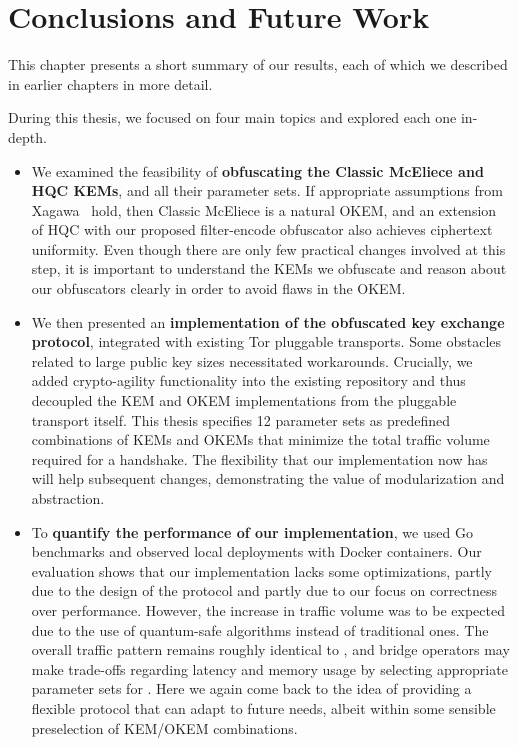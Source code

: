 \chapter{Conclusions and Future Work} \label{ch:conclusion}

This chapter presents a short summary of our results, each of which we described in earlier chapters in more detail.

During this thesis, we focused on four main topics and explored each one in-depth.
\begin{itemize}
    \item We examined the feasibility of \textbf{obfuscating the Classic McEliece and HQC KEMs}, and all their parameter sets. If appropriate assumptions from Xagawa~\cite{EC:Xagawa22} hold, then Classic McEliece is a natural OKEM, and an extension of HQC with our proposed filter-encode obfuscator also achieves ciphertext uniformity.
    Even though there are only few practical changes involved at this step, it is important to understand the KEMs we obfuscate and reason about our obfuscators clearly in order to avoid flaws in the OKEM.
    
    \item We then presented an \textbf{implementation of the \drivel{} obfuscated key exchange protocol}, integrated with existing Tor pluggable transports. Some obstacles related to large public key sizes necessitated workarounds. Crucially, we added crypto-agility functionality into the existing repository and thus decoupled the KEM and OKEM implementations from the pluggable transport itself. This thesis specifies 12 parameter sets as predefined combinations of KEMs and OKEMs that minimize the total traffic volume required for a handshake. The flexibility that our implementation now has will help subsequent changes, demonstrating the value of modularization and abstraction.
    
    \item To \textbf{quantify the performance of our implementation}, we used Go benchmarks and observed local deployments with Docker containers. Our evaluation shows that our implementation lacks some optimizations, partly due to the design of the \drivel{} protocol and partly due to our focus on correctness over performance. However, the increase in traffic volume was to be expected due to the use of quantum-safe algorithms instead of traditional ones. The overall traffic pattern remains roughly identical to \obfsfour{}, and bridge operators may make trade-offs regarding latency and memory usage by selecting appropriate parameter sets for \drivel{}. Here we again come back to the idea of providing a flexible protocol that can adapt to future needs, albeit within some sensible preselection of KEM/OKEM combinations.


\end{itemize}
